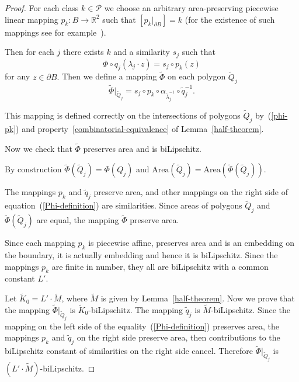 \documentclass[12pt]{article}
\theoremstyle{definition}
\begin{document}
\begin{proof}
For each class $k\in\mathcal P$ we choose an arbitrary area-preserving piecewise linear mapping $p_k:B\to\mathbb R^2$ such that $[p_k\big|_{\partial B}] = k$ (for the existence of such mappings see for example~\cite{BD}).

Then for each $j$ there exists $k$ and a similarity $s_j$ such that
\begin{equation}
\label{phi-pk}
\Phi\circ q_j(\lambda_j\cdot z) = s_j\circ p_k (z)
\end{equation}
for any $z\in\partial B.$ Then we define a mapping $\widetilde\Phi$ on each polygon $\widetilde Q_j$
\begin{equation}
\label{Phi-definition}
\widetilde\Phi\big|_{\widetilde Q_{j}} = s_{j}\circ p_k\circ \alpha_{\widetilde\lambda_{j}^{-1}} \circ \widetilde q_{j}^{-1}.
\end{equation}

This mapping is defined correctly on the intersections of polygons $\widetilde Q_j$ by~(\ref{phi-pk}) and property~\ref{combinatorial-equivalence} of Lemma~\ref{half-theorem}.

Now we check that $\widetilde\Phi$ preserves area and is biLipschitz.

By construction $\widetilde \Phi(\widetilde Q_j) = \Phi(Q_j)$ and $\mathrm{Area}\left(\widetilde Q_j\right) = \mathrm{Area}\left(\widetilde \Phi\left(\widetilde Q_j\right)\right).$

The mappings $p_k$ and $\widetilde q_{j}$ preserve area, and other mappings on the right side of equation~(\ref{Phi-definition}) are similarities. Since areas of polygons $\widetilde Q_j$ and $\widetilde \Phi(\widetilde Q_j)$ are equal, the mapping $\widetilde\Phi$ preserve area.

Since each mapping $p_k$ is piecewise affine, preserves area and is an embedding on the boundary, it is actually embedding and hence it is biLipschitz. Since the mappings $p_k$ are finite in number, they all are biLipschitz with a common constant $L'$.

Let $\widetilde K_0 = L'\cdot\widetilde M$, where $\widetilde M$ is given by Lemma~\ref{half-theorem}. Now we prove that the mapping $\widetilde\Phi\big|_{\widetilde Q_j}$ is $\widetilde K_0$-biLipschitz. The mapping $\widetilde q_j$ is $\widetilde M$-biLipschitz. Since the mapping on the left side of the equality~(\ref{Phi-definition}) preserves area, the mappings $p_k$ and $\widetilde q_j$ on the right side preserve area, then contributions to the biLipschitz constant of similarities on the right side cancel. Therefore $\widetilde\Phi\big|_{\widetilde Q_j}$ is $\left(L'\cdot\widetilde M\right)$-biLipschitz.


\end{proof}
\end{document}
